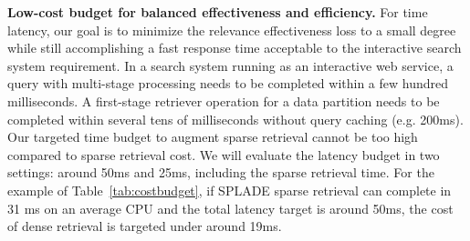 


{\bf Low-cost budget for balanced effectiveness and efficiency.}
For time latency, our goal is to minimize the relevance effectiveness loss to a small degree while still accomplishing  a fast response time
acceptable to the interactive search system requirement.
In a search system running as an interactive  web service,  a query with multi-stage processing
needs to be completed within a few hundred milliseconds.
A first-stage retriever operation  for a data partition needs to be completed within several tens of milliseconds without query caching (e.g. 200ms). 
Our targeted time budget to augment sparse retrieval cannot be too high     compared to  sparse retrieval cost.
We will evaluate the latency budget in two settings: around 50ms  and 25ms, including the  sparse retrieval time.
For the example of Table~\ref{tab:costbudget},
if SPLADE sparse retrieval can complete  in 31 ms on an  average CPU and the total latency
target is around 50ms,  the cost of dense retrieval is targeted under around  19ms.

